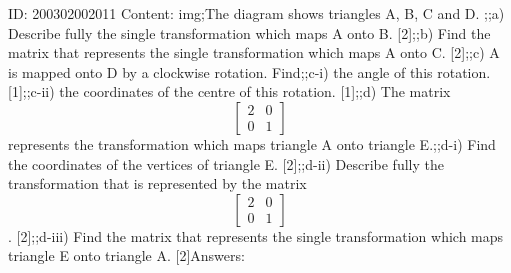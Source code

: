 \documentclass{article}
\begin{document}
ID: 200302002011
Content:
img;The diagram shows triangles A, B, C and D. ;;a) Describe fully the single transformation which maps A onto B. [2];;b) Find the matrix that represents the single transformation which maps A onto C. [2];;c) A is mapped onto D by a clockwise rotation. Find;;c-i) the angle of this rotation. [1];;c-ii) the coordinates of the centre of this rotation. [1];;d) The matrix $$\begin{bmatrix}2&0\\0&1\end{bmatrix}$$ represents the transformation which maps triangle A onto triangle E.;;d-i) Find the coordinates of the vertices of triangle E. [2];;d-ii) Describe fully the transformation that is represented by the matrix $$\begin{bmatrix}2&0\\0&1\end{bmatrix}$$. [2];;d-iii) Find the matrix that represents the single transformation which maps triangle E onto triangle A. [2]Answers:
\end{document}
